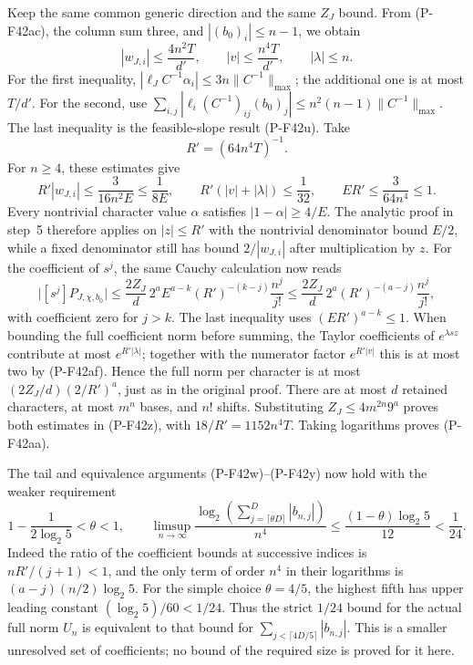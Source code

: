 \documentclass[11pt,a4paper]{article}
\begin{document}
Keep the same common generic direction and the same
\(Z_J\) bound. From (P-F42ac), the column sum three,
and \(|(b_0)_i|\le n-1\), we obtain
\[
 |w_{J,i}|\le\frac{4n^2T}{d'},\qquad
 |v|\le\frac{n^4T}{d'},\qquad |\lambda|\le n.
 \tag{P-F42ad}
\]
For the first inequality,
\(|\ell_JC^{-1}\alpha_i|\le3n\|C^{-1}\|_{\max}\);
the additional one is at most \(T/d'\).
For the second, use
\(\sum_{i,j}|\ell_i(C^{-1})_{ij}(b_0)_j|
 \le n^2(n-1)\|C^{-1}\|_{\max}\).
The last inequality is the feasible-slope result (P-F42u).
Take
\[
                  R'=(64n^4T)^{-1}.
 \tag{P-F42ae}
\]
For \(n\ge4\), these estimates give
\[
 R'|w_{J,i}|\le\frac{3}{16n^2E}\le\frac1{8E},
 \qquad R'(|v|+|\lambda|)\le\frac1{32},
 \qquad ER'\le\frac{3}{64n^4}\le1.
 \tag{P-F42af}
\]
Every nontrivial character value \(\alpha\) satisfies
\(|1-\alpha|\ge4/E\).
The analytic proof in step~5 therefore applies on
\(|z|\le R'\) with the nontrivial denominator bound \(E/2\),
while a fixed denominator still has bound
\(2/|w_{J,i}|\) after multiplication by \(z\).
For the coefficient of \(s^j\), the same Cauchy calculation
now reads
\[
 \bigl|[s^j]P_{J,\chi,b_0}\bigr|
 \le
 \frac{2Z_J}{d}\,2^a E^{a-k}
           (R')^{-(k-j)}\frac{n^j}{j!}
 \le
 \frac{2Z_J}{d}\,2^a
           (R')^{-(a-j)}\frac{n^j}{j!},
 \tag{P-F42ag}
\]
with coefficient zero for \(j>k\).
The last inequality uses \((ER')^{a-k}\le1\).
When bounding the full coefficient norm before summing,
the Taylor coefficients of \(e^{\lambda sz}\) contribute
at most \(e^{R'|\lambda|}\); together with the numerator
factor \(e^{R'|v|}\) this is at most two by (P-F42af).
Hence the full norm per character is at most
\((2Z_J/d)(2/R')^a\), just as in the original proof.
There are at most \(d\) retained characters, at most \(m^n\)
bases, and \(n!\) shifts. Substituting
\(Z_J\le4m^{2n}9^a\) proves both estimates in (P-F42z),
with \(18/R'=1152n^4T\).
Taking logarithms proves (P-F42aa).

The tail and equivalence arguments (P-F42w)--(P-F42y)
now hold with the weaker requirement
\[
       1-\frac1{2\log_2 5}<\theta<1,
 \qquad
 \limsup_{n\to\infty}
 \frac{\log_2\left(\sum_{j=\lceil\theta D\rceil}^{D}
                            |b_{n,j}|\right)}{n^4}
       \le\frac{(1-\theta)\log_2 5}{12}<\frac1{24}.
 \tag{P-F42ah}
\]
Indeed the ratio of the coefficient bounds at successive
indices is \(nR'/(j+1)<1\), and the only term of order
\(n^4\) in their logarithms is
\((a-j)(n/2)\log_2 5\).
For the simple choice \(\theta=4/5\), the highest fifth
has upper leading constant \((\log_2 5)/60<1/24\).
Thus the strict \(1/24\) bound for the actual full norm
\(U_n\) is equivalent to that bound for
\(\sum_{j<\lceil4D/5\rceil}|b_{n,j}|\).
This is a smaller unresolved set of coefficients;
no bound of the required size is proved for it here.
\end{document}
